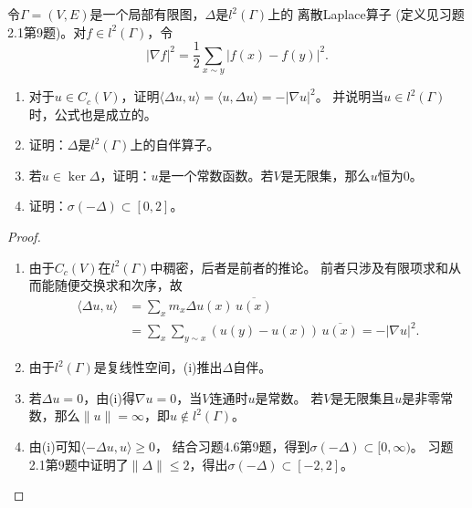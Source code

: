 \begin{17}
    令$\varGamma=(V,E)$是一个局部有限图，$\Delta$是$l^2(\varGamma)$上的
    离散Laplace算子 (定义见习题2.1第9题)。对$f \in l^2(\varGamma)$，令
    \[|\nabla f|^2=\frac{1}{2}\sum_{x \sim y}|f(x)-f(y)|^2.\]
    \begin{enumerate}[label=(\roman*)]
    \item 对于$u \in C_c(V)$，证明$\langle\Delta u,u\rangle=\langle u,\Delta u \rangle=-|\nabla u|^2$。
    并说明当$u \in l^2(\varGamma)$时，公式也是成立的。
    \item 证明：$\Delta$是$l^2(\varGamma)$上的自伴算子。
    \item 若$u\in\ker\Delta$，证明：$u$是一个常数函数。若$V$是无限集，那么$u$恒为$0$。
    \item 证明：$\sigma(-\Delta)\subset[0,2]$。
    \end{enumerate}
\end{17}
\begin{proof}
    \begin{enumerate}[label=(\roman*)]
    \item 由于$C_c(V)$在$l^2(\varGamma)$中稠密，后者是前者的推论。
    前者只涉及有限项求和从而能随便交换求和次序，故
    \begin{align*}
        \langle\Delta u,u\rangle&=\sum_xm_x\Delta u(x)\,\overline{u(x)}\\
        &=\sum_x\sum_{y \sim x}(u(y)-u(x))\,\overline{u(x)}=-|\nabla u|^2.
    \end{align*}
    \item 由于$l^2(\varGamma)$是复线性空间，(i)推出$\Delta$自伴。
    \item 若$\Delta u=0$，由(i)得$\nabla u=0$，当$V$连通时$u$是常数。
    若$V$是无限集且$u$是非零常数，那么$\|u\|=\infty$，即$u \notin l^2(\varGamma)$。
    \item 由(i)可知$\langle-\Delta u,u\rangle\geqslant0$，
    结合习题4.6第9题，得到$\sigma(-\Delta)\subset[0,\infty)$。
    习题2.1第9题中证明了$\|\Delta\|\leqslant2$，得出$\sigma(-\Delta)\subset[-2,2]$。\qedhere
    \end{enumerate}
\end{proof}

